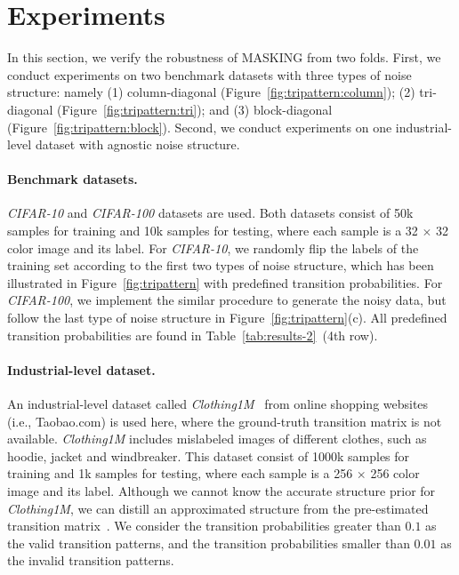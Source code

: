 \documentclass{article}
\begin{document}
\section{Experiments}
In this section, we verify the robustness of MASKING from two folds. First, we conduct experiments on two benchmark datasets with three types of noise structure: namely (1) column-diagonal (Figure~\ref{fig:tripattern:column}); (2) tri-diagonal (Figure~\ref{fig:tripattern:tri}); and (3) block-diagonal (Figure~\ref{fig:tripattern:block}). Second, we conduct experiments on one industrial-level dataset with agnostic noise structure.

\vspace{-5px}
\paragraph{Benchmark datasets.} \textit{CIFAR-10} and \textit{CIFAR-100} datasets are used. Both datasets consist of 50k samples for training and 10k samples for testing, where each sample is a 32 $\times$ 32 color image and its label. For \textit{CIFAR-10}, we randomly flip the labels of the training set according to the first two types of noise structure, which has been illustrated in Figure~\ref{fig:tripattern} with predefined transition probabilities. For \textit{CIFAR-100}, we implement the similar procedure to generate the noisy data, but follow the last type of noise structure in Figure~\ref{fig:tripattern}(c). All predefined transition probabilities are found in Table~\ref{tab:results-2}~(4th row).
\paragraph{Industrial-level dataset.} An industrial-level dataset called \emph{Clothing1M}~\cite{xiao2015learning} from online shopping websites (i.e., Taobao.com) is used here, where the ground-truth transition matrix is not available. \textit{Clothing1M} includes mislabeled images of different clothes, such as hoodie, jacket and windbreaker. This dataset consist of 1000k samples for training and 1k samples for testing, where each sample is a 256 $\times$ 256 color image and its label. Although we cannot know the accurate structure prior for \textit{Clothing1M}, we can distill an approximated structure from the pre-estimated transition matrix~\cite{xiao2015learning}. We consider the transition probabilities greater than $0.1$ as the valid transition patterns, and the transition probabilities smaller than $0.01$ as the invalid transition patterns.
\end{document}

